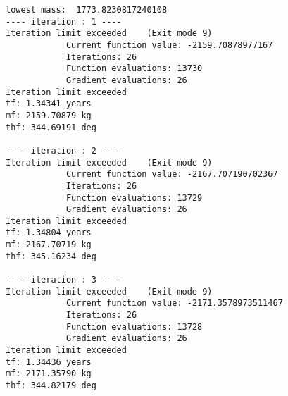 \documentclass[11pt]{article}
\begin{document}
    \begin{Verbatim}[commandchars=\\\{\}]
lowest mass:  1773.8230817240108
---- iteration : 1 ----
Iteration limit exceeded    (Exit mode 9)
            Current function value: -2159.70878977167
            Iterations: 26
            Function evaluations: 13730
            Gradient evaluations: 26
Iteration limit exceeded
tf: 1.34341 years
mf: 2159.70879 kg
thf: 344.69191 deg

---- iteration : 2 ----
Iteration limit exceeded    (Exit mode 9)
            Current function value: -2167.707190702367
            Iterations: 26
            Function evaluations: 13729
            Gradient evaluations: 26
Iteration limit exceeded
tf: 1.34804 years
mf: 2167.70719 kg
thf: 345.16234 deg

---- iteration : 3 ----
Iteration limit exceeded    (Exit mode 9)
            Current function value: -2171.3578973511467
            Iterations: 26
            Function evaluations: 13728
            Gradient evaluations: 26
Iteration limit exceeded
tf: 1.34436 years
mf: 2171.35790 kg
thf: 344.82179 deg


    \end{Verbatim}
\end{document}
